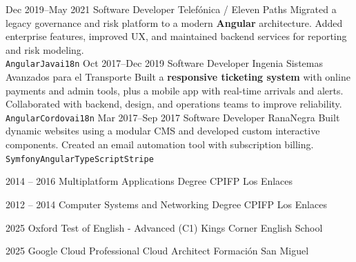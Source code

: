\documentclass[9pt]{developercv} %
\begin{document}
\begin{entrylist}
    \entry
		{Dec 2019--May 2021}
		{Software Developer}
		{Telefónica / Eleven Paths}
		{Migrated a legacy governance and risk platform to a modern \textbf{Angular} architecture. Added enterprise features, improved UX, and maintained backend services for reporting and risk modeling. \\
        \texttt{Angular}\slashsep\texttt{Java}\slashsep\texttt{i18n}}
    \entry
		{Oct 2017--Dec 2019}
		{Software Developer}
		{Ingenia Sistemas Avanzados para el Transporte}
		{Built a \textbf{responsive ticketing system} with online payments and admin tools, plus a mobile app with real-time arrivals and alerts. Collaborated with backend, design, and operations teams to improve reliability. \\
        \texttt{Angular}\slashsep\texttt{Cordova}\slashsep\texttt{i18n}}
    \entry
		{Mar 2017--Sep 2017}
		{Software Developer}
		{RanaNegra}
		{Built dynamic websites using a modular CMS and developed custom interactive components. Created an email automation tool with subscription billing. \\
        \texttt{Symfony}\slashsep\texttt{Angular}\slashsep\texttt{TypeScript}\slashsep\texttt{Stripe}}
\end{entrylist}


\begin{entrylist}
	\entry
		{2014 -- 2016}
		{Multiplatform Applications Degree}
		{CPIFP Los Enlaces}
		{}

    \entry
		{2012 -- 2014}
		{Computer Systems and Networking Degree}
		{CPIFP Los Enlaces}
		{}

	\entry
		{2025}
		{Oxford Test of English - Advanced (C1)}
		{Kings Corner English School}
		{}

    \entry
		{2025}
		{Google Cloud Professional Cloud Architect}
		{Formación San Miguel}
		{}
\end{entrylist}
\end{document}
